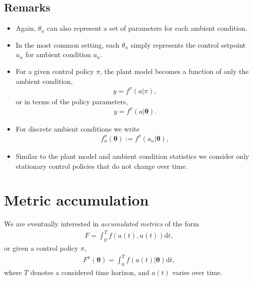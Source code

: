 \documentclass{article}
\begin{document}
\subsection*{Remarks}
\begin{itemize}
    \item Again, $\theta_n$ can also represent a set of parameters for each ambient condition.
    \item In the most common setting, each $\theta_n$ simply represents the control setpoint $u_n$ for ambient condition $a_n$.
    \item For a given control policy $\pi$, the plant model becomes a function of only the ambient condition,
    \begin{align}
        y = f^\pi(a | \pi),
    \end{align}
    or in terms of the policy parameters,
    \begin{align}
        y = f^\pi(a | \boldsymbol{\theta}).
    \end{align}
    \item For discrete ambient conditions we write
    \begin{align}
        f_n^\pi(\boldsymbol{\theta}) := f^\pi(a_n | \boldsymbol{\theta}),
    \end{align}
    \item Similar to the plant model and ambient condition statistics we consider only stationary control policies that do not change over time.
\end{itemize}

\section{Metric accumulation}
We are eventually interested in \textit{accumulated metrics} of the form
\begin{align}
    F = \int_0^T f(a(t), u(t)) \text{d}t,
\end{align}
or given a control policy $\pi$,
\begin{align}
    F^\pi(\boldsymbol{\theta}) = \int_0^T f(a(t) | \boldsymbol{\theta}) \text{d}t,
\end{align}
where $T$ denotes a considered time horizon, and $a(t)$ varies over time.
\end{document}
